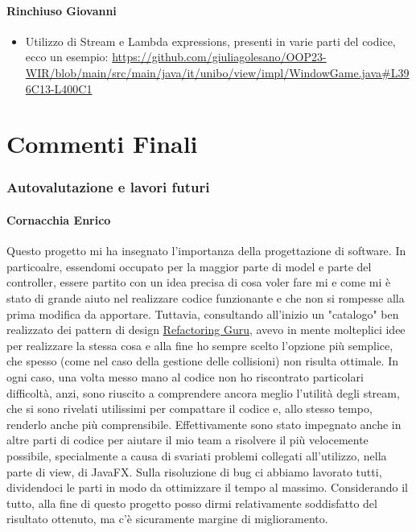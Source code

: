 \documentclass[a4paper,12pt]{report}
\begin{document}
\subsubsection{Rinchiuso Giovanni}
\begin{itemize}
\item Utilizzo di Stream e Lambda expressions, presenti in varie parti del codice, ecco un esempio: 
\url {https://github.com/giuliagolesano/OOP23-WIR/blob/main/src/main/java/it/unibo/view/impl/WindowGame.java#L396C13-L400C1}
\end{itemize}

\chapter{Commenti Finali}
\subsection{Autovalutazione e lavori futuri}

\subsubsection{Cornacchia Enrico}
Questo progetto mi ha insegnato l'importanza della progettazione di software. In particoalre, essendomi occupato per la maggior parte di model e parte del controller, essere partito con un idea precisa di cosa voler fare mi e come mi è stato di grande aiuto nel realizzare codice funzionante e che non si rompesse alla prima modifica da apportare. Tuttavia, consultando all'inizio un "catalogo" ben realizzato dei pattern di design \href{https://refactoring.guru/design-patterns}{Refactoring Guru}, avevo in mente molteplici idee per realizzare la stessa cosa e alla fine ho sempre scelto l'opzione più semplice, che spesso (come nel caso della gestione delle collisioni) non risulta ottimale. In ogni caso, una volta messo mano al codice non ho riscontrato particolari difficoltà, anzi, sono riuscito a comprendere ancora meglio l'utilità degli stream, che si sono rivelati utilissimi per compattare il codice e, allo stesso tempo, renderlo anche più comprensibile. Effettivamente sono stato impegnato anche in altre parti di codice per aiutare il mio team a risolvere il più velocemente possibile, specialmente a causa di svariati problemi collegati all'utilizzo, nella parte di view, di JavaFX. Sulla risoluzione di bug ci abbiamo lavorato tutti, dividendoci le parti in modo da ottimizzare il tempo al massimo. Considerando il tutto, alla fine di questo progetto posso dirmi relativamente soddisfatto del risultato ottenuto, ma c'è sicuramente margine di miglioramento.
\end{document}

